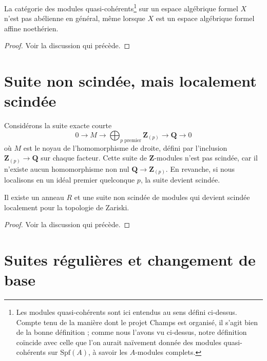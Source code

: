 \begin{lemma}
\label{lemma-quasi-coherent-not-abelian}
La catégorie des modules quasi-cohérents\footnote{Les modules quasi-cohérents
sont ici entendus au sens défini ci-dessus. Compte tenu de la manière dont le projet Champs
est organisé, il s'agit bien de la bonne définition ; comme nous l'avons vu ci-dessus,
notre définition coïncide avec celle que l'on aurait naïvement donnée des modules quasi-cohérents
sur $\text{Spf}(A)$, à savoir les $A$-modules complets.}
sur un espace algébrique formel
$X$ n'est pas abélienne en général, même lorsque $X$ est un espace algébrique
formel affine noethérien.
\end{lemma}

\begin{proof}
Voir la discussion qui précède.
\end{proof}





\section{Suite non scindée, mais localement scindée}
\label{section-nonsplit-locally-split}

\noindent
Considérons la suite exacte courte
$$
0 \to M \to
\bigoplus\nolimits_{p\text{ premier}} \mathbf{Z}_{(p)} \to \mathbf{Q} \to 0
$$
où $M$ est le noyau de l'homomorphisme de droite, défini par l'inclusion
$\mathbf{Z}_{(p)} \to \mathbf{Q}$ sur chaque facteur. Cette suite de
$\mathbf{Z}$-modules n'est pas scindée, car il n'existe aucun
homomorphisme non nul $\mathbf{Q} \to \mathbf{Z}_{(p)}$. En revanche, si
nous localisons en un idéal premier quelconque $p$, la suite devient scindée.

\begin{lemma}
\label{lemma-nonsplit-locally-split}
Il existe un anneau $R$ et une suite non scindée de modules
qui devient scindée localement pour la topologie de Zariski.
\end{lemma}

\begin{proof}
Voir la discussion qui précède.
\end{proof}





\section{Suites régulières et changement de base}
\label{section-regular-base-change}

